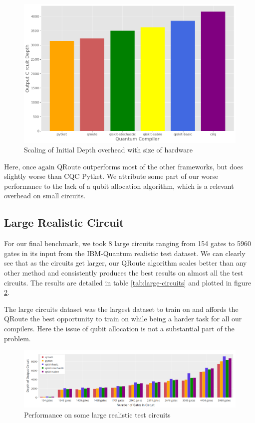 \documentclass[%
 reprint,
 amsmath,amssymb,
 aps,
]{revtex4-2}
\begin{document}
\begin{figure}[t]
    \includegraphics[width=\linewidth]{images/results-small.png}
    \caption{\label{fig:results-small}
        Scaling of Initial Depth overhead with size of hardware}
\end{figure}

Here, once again QRoute outperforms most of the other frameworks, but does slightly worse than CQC Pytket. We attribute some part of our worse performance to the lack of a qubit allocation algorithm, which is a relevant overhead on small circuits.

\subsection{\label{sec:results-realistic}Large Realistic Circuit}

For our final benchmark, we took 8 large circuits ranging from 154 gates to 5960 gates in its input from the IBM-Quantum realistic test dataset. We can clearly see that as the circuits get larger, our QRoute algorithm scales better than any other method and consistently produces the best results on almost all the test circuits. The results are detailed in table \ref{tab:large-circuits} and plotted in figure \ref{fig:results-large}.

The large circuits dataset was the largest dataset to train on and affords the QRoute the best opportunity to train on while being a harder task for all our compilers. Here the issue of qubit allocation is not a substantial part of the problem.

\begin{figure}[t]
    \includegraphics[width=\linewidth]{images/results-large.png}
    \caption{\label{fig:results-large}
        Performance on some large realistic test circuits}
\end{figure}
\end{document}
